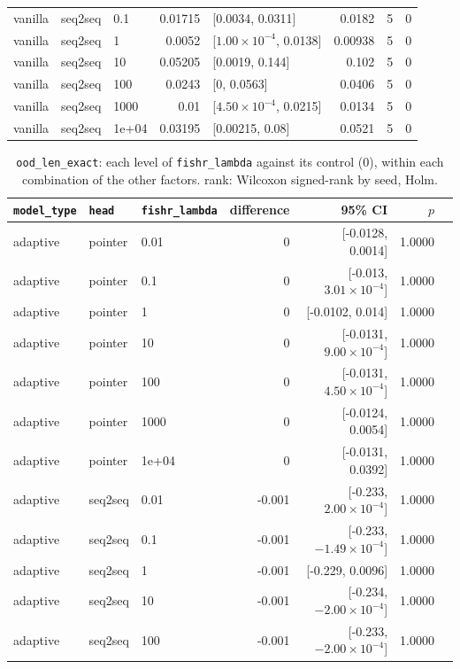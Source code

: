 \documentclass[10pt]{article}
\begin{document}
{\begin{longtable}{lllrlrrr}
vanilla & seq2seq & 0.1 & 0.01715 & [0.0034, 0.0311] & 0.0182 & 5 & 0\\
vanilla & seq2seq & 1 & 0.0052 & [$1.00\times10^{-4}$, 0.0138] & 0.00938 & 5 & 0\\
vanilla & seq2seq & 10 & 0.05205 & [0.0019, 0.144] & 0.102 & 5 & 0\\
vanilla & seq2seq & 100 & 0.0243 & [0, 0.0563] & 0.0406 & 5 & 0\\
vanilla & seq2seq & 1000 & 0.01 & [$4.50\times10^{-4}$, 0.0215] & 0.0134 & 5 & 0\\
vanilla & seq2seq & 1e+04 & 0.03195 & [0.00215, 0.08] & 0.0521 & 5 & 0\\
\bottomrule
\end{longtable}
}

{\small
\begin{longtable}{lllrrrl}
\caption{\texttt{ood\_len\_exact}: each level of \texttt{fishr\_lambda} against its control (0), within each combination of the other factors. rank: Wilcoxon signed-rank by seed, Holm.}\label{tab:control-ood_len_exact}\\
\toprule
\texttt{model\_type} & \texttt{head} & \texttt{fishr\_lambda} & difference & 95\% CI & $p$ & \\
\midrule
\endhead
adaptive & pointer & 0.01 & 0 & [-0.0128, 0.0014] & 1.0000 & \\
adaptive & pointer & 0.1 & 0 & [-0.013, $3.01\times10^{-4}$] & 1.0000 & \\
adaptive & pointer & 1 & 0 & [-0.0102, 0.014] & 1.0000 & \\
adaptive & pointer & 10 & 0 & [-0.0131, $9.00\times10^{-4}$] & 1.0000 & \\
adaptive & pointer & 100 & 0 & [-0.0131, $4.50\times10^{-4}$] & 1.0000 & \\
adaptive & pointer & 1000 & 0 & [-0.0124, 0.0054] & 1.0000 & \\
adaptive & pointer & 1e+04 & 0 & [-0.0131, 0.0392] & 1.0000 & \\
adaptive & seq2seq & 0.01 & -0.001 & [-0.233, $2.00\times10^{-4}$] & 1.0000 & \\
adaptive & seq2seq & 0.1 & -0.001 & [-0.233, $-1.49\times10^{-4}$] & 1.0000 & \\
adaptive & seq2seq & 1 & -0.001 & [-0.229, 0.0096] & 1.0000 & \\
adaptive & seq2seq & 10 & -0.001 & [-0.234, $-2.00\times10^{-4}$] & 1.0000 & \\
adaptive & seq2seq & 100 & -0.001 & [-0.233, $-2.00\times10^{-4}$] & 1.0000 & \\

\end{longtable}}
\end{document}

